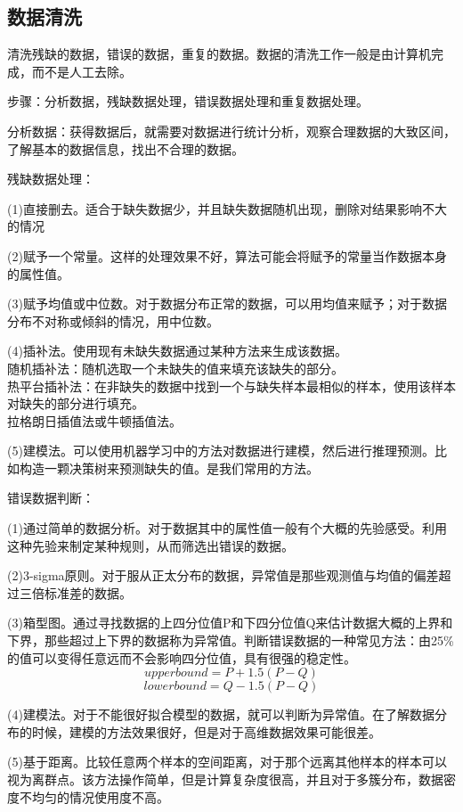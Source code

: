 \documentclass[openbib]{article}
\begin{document}
\subsection{数据清洗}
清洗残缺的数据，错误的数据，重复的数据。数据的清洗工作一般是由计算机完成，而不是人工去除。

步骤：分析数据，残缺数据处理，错误数据处理和重复数据处理。

分析数据：获得数据后，就需要对数据进行统计分析，观察合理数据的大致区间，了解基本的数据信息，找出不合理的数据。

残缺数据处理：

(1)直接删去。适合于缺失数据少，并且缺失数据随机出现，删除对结果影响不大的情况

(2)赋予一个常量。这样的处理效果不好，算法可能会将赋予的常量当作数据本身的属性值。

(3)赋予均值或中位数。对于数据分布正常的数据，可以用均值来赋予；对于数据分布不对称或倾斜的情况，用中位数。

(4)插补法。使用现有未缺失数据通过某种方法来生成该数据。
\\随机插补法：随机选取一个未缺失的值来填充该缺失的部分。
\\热平台插补法：在非缺失的数据中找到一个与缺失样本最相似的样本，使用该样本对缺失的部分进行填充。
\\拉格朗日插值法或牛顿插值法。

(5)建模法。可以使用机器学习中的方法对数据进行建模，然后进行推理预测。比如构造一颗决策树来预测缺失的值。是我们常用的方法。

错误数据判断：

(1)通过简单的数据分析。对于数据其中的属性值一般有个大概的先验感受。利用这种先验来制定某种规则，从而筛选出错误的数据。

(2)3-sigma原则。对于服从正太分布的数据，异常值是那些观测值与均值的偏差超过三倍标准差的数据。

(3)箱型图。通过寻找数据的上四分位值P和下四分位值Q来估计数据大概的上界和下界，那些超过上下界的数据称为异常值。判断错误数据的一种常见方法：由25\%的值可以变得任意远而不会影响四分位值，具有很强的稳定性。
$$upperbound = P+1.5(P-Q)$$
$$lowerbound = Q-1.5(P-Q)$$

(4)建模法。对于不能很好拟合模型的数据，就可以判断为异常值。在了解数据分布的时候，建模的方法效果很好，但是对于高维数据效果可能很差。

(5)基于距离。比较任意两个样本的空间距离，对于那个远离其他样本的样本可以视为离群点。该方法操作简单，但是计算复杂度很高，并且对于多簇分布，数据密度不均匀的情况使用度不高。
\end{document}
